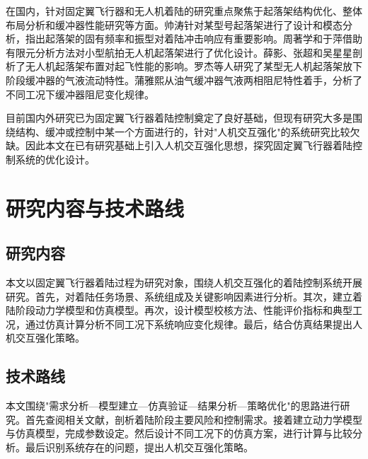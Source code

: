 在国内，针对固定翼飞行器和无人机着陆的研究重点聚焦于起落架结构优化、整体布局分析和缓冲器性能研究等方面。帅涛针对某型号起落架进行了设计和模态分析，指出起落架的固有频率和振型对着陆冲击响应有重要影响。周著学和于萍借助有限元分析方法对小型航拍无人机起落架进行了优化设计。薛影、张超和吴星星剖析了无人机起落架布置对起飞性能的影响。罗杰等人研究了某型无人机起落架放下阶段缓冲器的气液流动特性。蒲雅熙从油气缓冲器气液两相阻尼特性着手，分析了不同工况下缓冲器阻尼变化规律。

目前国内外研究已为固定翼飞行器着陆控制奠定了良好基础，但现有研究大多是围绕结构、缓冲或控制中某一个方面进行的，针对"人机交互强化"的系统研究比较欠缺。因此本文在已有研究基础上引入人机交互强化思想，探究固定翼飞行器着陆控制系统的优化设计。

\section{研究内容与技术路线}

\subsection{研究内容}

本文以固定翼飞行器着陆过程为研究对象，围绕人机交互强化的着陆控制系统开展研究。首先，对着陆任务场景、系统组成及关键影响因素进行分析。其次，建立着陆阶段动力学模型和仿真模型。再次，设计模型校核方法、性能评价指标和典型工况，通过仿真计算分析不同工况下系统响应变化规律。最后，结合仿真结果提出人机交互强化策略。

\subsection{技术路线}

本文围绕"需求分析—模型建立—仿真验证—结果分析—策略优化"的思路进行研究。首先查阅相关文献，剖析着陆阶段主要风险和控制需求。接着建立动力学模型与仿真模型，完成参数设定。然后设计不同工况下的仿真方案，进行计算与比较分析。最后识别系统存在的问题，提出人机交互强化策略。
